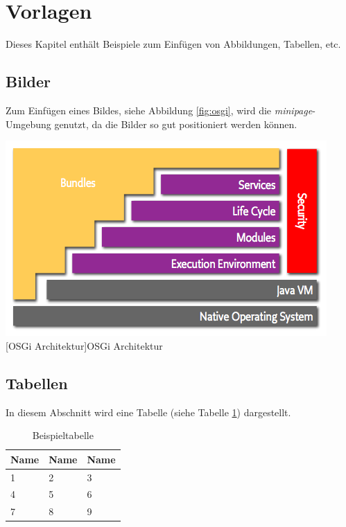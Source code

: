 \documentclass[12pt,a4paper,bibliography=totocnumbered,listof=totoc]{scrartcl}
\begin{document}
\pagebreak

\section{Vorlagen}
Dieses Kapitel enthält Beispiele zum Einfügen von Abbildungen, Tabellen, etc.

\subsection{Bilder}
Zum Einfügen eines Bildes, siehe Abbildung \ref{fig:osgi}, wird die \textit{minipage}-Umgebung genutzt, da die Bilder so gut positioniert werden können.

\vspace{1em}
\begin{minipage}{\linewidth}
	\centering
	\includegraphics[width=0.7\linewidth]{Bilder/layering-osgi.png}
	[OSGi Architektur]{OSGi Architektur\footnotemark }
	\label{fig:osgi}
\end{minipage}

\subsection{Tabellen}
In diesem Abschnitt wird eine Tabelle (siehe Tabelle \ref{tab:beispiel}) dargestellt.

\vspace{1em}
\begin{table}[!h]
	\centering
	\begin{tabular}{|l|l|l|}
		\hline
		\textbf{Name} & \textbf{Name} & \textbf{Name}\\
		\hline
		1 & 2 & 3\\
		\hline
		4 & 5 & 6\\
		\hline
		7 & 8 & 9\\
		\hline
	\end{tabular}
	\caption{Beispieltabelle}
	\label{tab:beispiel}
\end{table}
\end{document}
